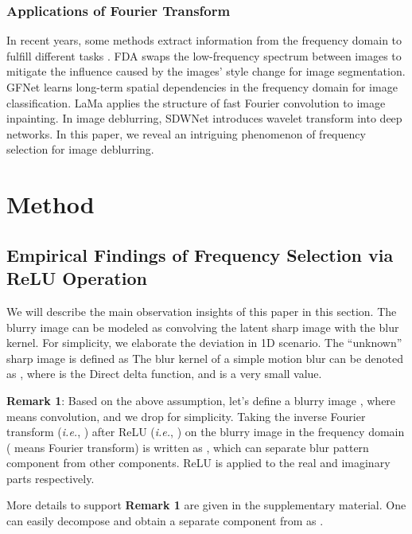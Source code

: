 \documentclass[letterpaper]{article} \usepackage{aaai23}  \usepackage{times}  \usepackage{helvet}  \usepackage{courier}  \usepackage[hyphens]{url}  \usepackage{graphicx} \usepackage{enumitem}
\begin{document}
\subsubsection{Applications of Fourier Transform}

In recent years, some methods extract information from the frequency domain to fulfill different tasks \cite{Chi2019fast,Rippel2015spectral,Zhong2018joint,Yang2020fda,Rao2021global,Suvorov2022resolution}. FDA \cite{Yang2020fda} swaps the low-frequency spectrum between images to mitigate the influence caused by the images' style change for image segmentation. GFNet \cite{Rao2021global} learns long-term spatial dependencies in the frequency domain for image classification. LaMa \cite{Suvorov2022resolution} applies the structure of fast Fourier convolution \cite{Chi2020fast} to image inpainting. In image deblurring, SDWNet \cite{Zou2021sdwnet} introduces wavelet transform into deep networks. In this paper, we reveal an intriguing phenomenon of frequency selection for image deblurring.

\section{Method}
\label{sec:method}
\subsection{Empirical Findings of Frequency Selection via ReLU Operation}
We will describe the main observation insights of this paper in this section. The blurry image can be modeled as convolving the latent sharp image with the blur kernel. For simplicity, we elaborate the deviation in 1D scenario. The ``unknown'' sharp image is defined as  The blur kernel of a simple motion blur can be denoted as , where  is the Direct delta function, and  is a very small value.

\noindent\textbf{Remark 1}: Based on the above assumption, let's define a blurry image , where  means convolution, and we drop  for simplicity. Taking the inverse Fourier transform (\emph{i.e.}, ) after ReLU (\emph{i.e.}, ) on the blurry image in the frequency domain ( means Fourier transform) is written as , which can separate blur pattern component from other components. ReLU is applied to the real and imaginary parts respectively.

More details to support \textbf{Remark 1} are given in the supplementary material. One can easily decompose  and obtain a separate component from  as  . 
\end{document}
